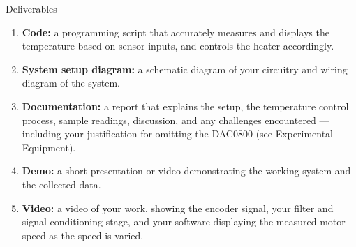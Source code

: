 \begin{labsection}{Deliverables}{}
  \begin{enumerate}
    \item \textbf{Code:} a programming script that accurately measures and displays the temperature based on sensor inputs, and controls the heater accordingly.
    \item \textbf{System setup diagram:} a schematic diagram of your circuitry and wiring diagram of the system.
    \item \textbf{Documentation:} a report that explains the setup, the temperature control process, sample readings, discussion, and any challenges encountered --- including your justification for omitting the DAC0800 (see Experimental Equipment).
    \item \textbf{Demo:} a short presentation or video demonstrating the working system and the collected data.
    \item \textbf{Video:} a video of your work, showing the encoder signal, your filter and signal-conditioning stage, and your software displaying the measured motor speed as the speed is varied.
  \end{enumerate}
\end{labsection}


